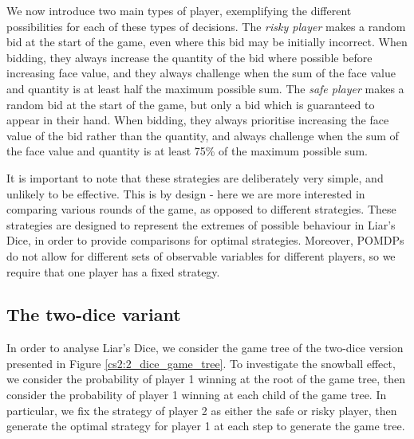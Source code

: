 We now introduce two main types of player, exemplifying the different possibilities for each of these types of decisions. The \emph{risky player} makes a random bid at the start of the game, even where this bid may be initially incorrect. When bidding, they always increase the quantity of the bid where possible before increasing face value, and they always challenge when the sum of the face value and quantity is at least half the maximum possible sum. The \emph{safe player} makes a random bid at the start of the game, but only a bid which is guaranteed to appear in their hand. When bidding, they always prioritise increasing the face value of the bid rather than the quantity, and always challenge when the sum of the face value and quantity is at least 75\% of the maximum possible sum.

It is important to note that these strategies are deliberately very simple, and unlikely to be effective. This is by design - here we are more interested in comparing various rounds of the game, as opposed to different strategies. These strategies are designed to represent the extremes of possible behaviour in Liar's Dice, in order to provide comparisons for optimal strategies. Moreover, POMDPs do not allow for different sets of observable variables for different players, so we require that one player has a fixed strategy.

\subsection{The two-dice variant}

In order to analyse Liar's Dice, we consider the game tree of the two-dice version presented in Figure \ref{cs2:2_dice_game_tree}. To investigate the snowball effect, we consider the probability of player 1 winning at the root of the game tree, then consider the probability of player 1 winning at each child of the game tree. In particular, we fix the strategy of player 2 as either the safe or risky player, then generate the optimal strategy for player 1 at each step to generate the game tree.



